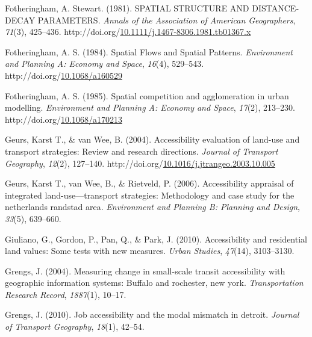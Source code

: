 \documentclass[
11pt, %
oneside, %
english, %
singlespacing, %
]{macthesis} %
\newlength{\cslhangindent}
\newenvironment{CSLReferences}[2] %
{\begin{list}{}{%
	\setlength{\itemindent}{0pt}
	\setlength{\leftmargin}{0pt}
	\setlength{\parsep}{0pt}
	\ifodd #1
	\setlength{\leftmargin}{\cslhangindent}
	\setlength{\itemindent}{-1\cslhangindent}
	\fi
	\setlength{\itemsep}{#2\baselineskip}}}
{\end{list}}
\begin{document}
\begin{CSLReferences}{1}{0}
Fotheringham, A. Stewart. (1981). {SPATIAL} {STRUCTURE} {AND} {DISTANCE}‐{DECAY} {PARAMETERS}. \emph{Annals of the Association of American Geographers}, \emph{71}(3), 425--436. http://doi.org/\href{https://doi.org/10.1111/j.1467-8306.1981.tb01367.x}{10.1111/j.1467-8306.1981.tb01367.x}

Fotheringham, A. S. (1984). Spatial {Flows} and {Spatial} {Patterns}. \emph{Environment and Planning A: Economy and Space}, \emph{16}(4), 529--543. http://doi.org/\href{https://doi.org/10.1068/a160529}{10.1068/a160529}

Fotheringham, A. S. (1985). Spatial competition and agglomeration in urban modelling. \emph{Environment and Planning A: Economy and Space}, \emph{17}(2), 213--230. http://doi.org/\href{https://doi.org/10.1068/a170213}{10.1068/a170213}

Geurs, Karst T., \& van Wee, B. (2004). Accessibility evaluation of land-use and transport strategies: Review and research directions. \emph{Journal of Transport Geography}, \emph{12}(2), 127--140. http://doi.org/\href{https://doi.org/10.1016/j.jtrangeo.2003.10.005}{10.1016/j.jtrangeo.2003.10.005}

Geurs, Karst T., van Wee, B., \& Rietveld, P. (2006). Accessibility appraisal of integrated land-use---transport strategies: Methodology and case study for the netherlands randstad area. \emph{Environment and Planning B: Planning and Design}, \emph{33}(5), 639--660.

Giuliano, G., Gordon, P., Pan, Q., \& Park, J. (2010). Accessibility and residential land values: Some tests with new measures. \emph{Urban Studies}, \emph{47}(14), 3103--3130.

Grengs, J. (2004). Measuring change in small-scale transit accessibility with geographic information systems: Buffalo and rochester, new york. \emph{Transportation Research Record}, \emph{1887}(1), 10--17.

Grengs, J. (2010). Job accessibility and the modal mismatch in detroit. \emph{Journal of Transport Geography}, \emph{18}(1), 42--54.


\end{CSLReferences}
\end{document}
